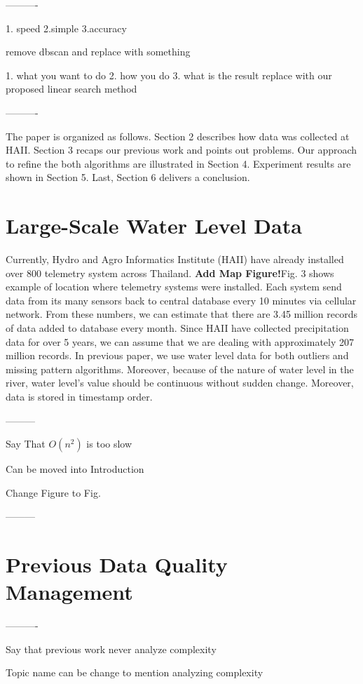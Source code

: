 \documentclass[conference]{IEEEtran}
\begin{document}
----------

1. speed 2.simple 3.accuracy

remove dbscan and replace with something

1. what you want to do 2. how you do 3. what is the result
replace with our proposed linear search method

----------

The paper is organized as follows. Section 2 describes how data was collected at HAII. Section 3 recaps our previous work and points out problems. Our approach to refine the both algorithms are illustrated in Section 4. Experiment results are shown in Section 5. Last, Section 6 delivers a conclusion.

\section{Large-Scale Water Level Data}

Currently, Hydro and Agro Informatics Institute (HAII) have already installed over 800 telemetry system across Thailand. \textbf{\color{red}Add Map Figure!}Fig. 3 shows example of location where telemetry systems were installed. Each system send data from its many sensors back to central database every 10 minutes via cellular network. From these numbers, we can estimate that there are 3.45 million records of data added to database every month. Since HAII have collected precipitation data for over 5 years, we can assume that we are dealing with approximately 207 million records. In previous paper, we use water level data for both outliers and missing pattern algorithms. Moreover, because of the nature of water level in the river, water level's value should be continuous without sudden change. Moreover, data is stored in timestamp order.

---------

Say That $O(n^2)$ is too slow

Can be moved into Introduction

Change Figure to Fig.

---------

\section{Previous Data Quality Management}


----------

Say that previous work never analyze complexity

Topic name can be change to mention analyzing complexity
\end{document}
